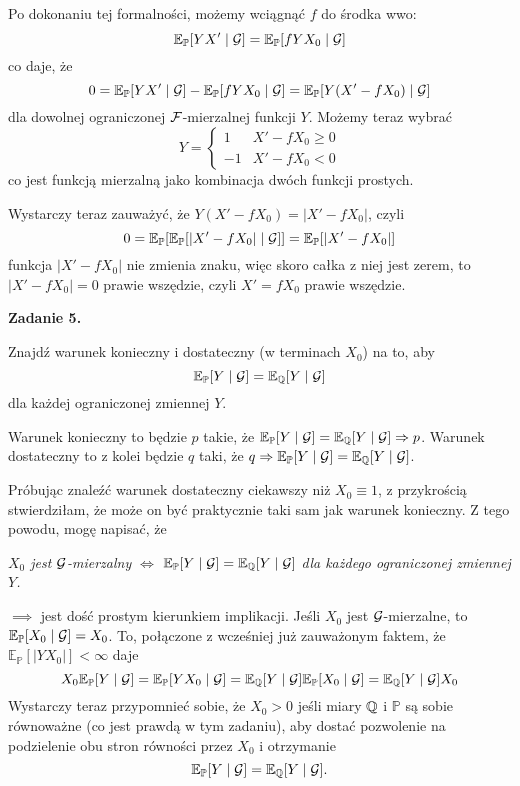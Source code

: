\documentclass{article}
\newcommand{\E}{\mathbb{E}}
\renewcommand{\P}{\mathbb{P}}
\begin{document}

Po dokonaniu tej formalności, możemy wciągnąć $f$ do środka wwo:
$$\E_{\P}[YX'\;|\;\set{G}]=\E_{\P}[fYX_0\;|\;\set{G}]$$
co daje, że
$$0=\E_{\P}[YX'\;|\;\set{G}]-\E_{\P}[fYX_0\;|\;\set{G}]=\E_{\P}[Y(X'-fX_0)\;|\;\set{G}]$$
dla dowolnej ograniczonej $\mathcal{F}$-mierzalnej funkcji $Y$. Możemy teraz wybrać
$$Y=\begin{cases}1&X'-fX_0\geq 0\\ -1&X'-fX_0<0\end{cases}$$
co jest funkcją mierzalną jako kombinacja dwóch funkcji prostych.

Wystarczy teraz zauważyć, że $Y(X'-fX_0)=|X'-fX_0|$, czyli
$$0=\E_{\P}[\E_{\P}[|X'-fX_0|\;|\;\set{G}]]=\E_{\P}[|X'-fX_0|]$$
funkcja $|X'-fX_0|$ nie zmienia znaku, więc skoro całka z niej jest zerem, to $|X'-fX_0|=0$ prawie wszędzie, czyli $X'=fX_0$ prawie wszędzie.

\bigskip

{\bfseries{\large\color{orange}Zadanie 5.}

  Znajdź warunek konieczny i dostateczny (w terminach $X_0$) na to, aby
  $$\E_{\P}[Y\;|\;\set{G}]=\E_{\Q}[Y\;|\;\set{G}]$$
  dla każdej ograniczonej zmiennej $Y$.
}

Warunek konieczny to będzie $p$ takie, że $\E_{\P}[Y\;|\;\set{G}]=\E_{\Q}[Y\;|\;\set{G}]\implies p$. Warunek dostateczny to z kolei będzie $q$ taki, że $q\implies \E_{\P}[Y\;|\;\set{G}]=\E_{\Q}[Y\;|\;\set{G}]$.

Próbując znaleźć warunek dostateczny ciekawszy niż $X_0\equiv 1$, z przykrością stwierdziłam, że może on być praktycznie taki sam jak warunek konieczny. Z tego powodu, mogę napisać, że

\begin{center}\slshape
  $X_0$ jest $\mathcal{G}$-mierzalny $\iff$ $\E_{\P}[Y\;|\;\set{G}]=\E_{\Q}[Y\;|\;\set{G}]$ dla każdego ograniczonej zmiennej $Y$.
\end{center}

$\implies$ jest dość prostym kierunkiem implikacji. Jeśli $X_0$ jest $\mathcal{G}$-mierzalne, to $\E_{\P}[X_0\;|\;\set{G}]=X_0$. To, połączone z wcześniej już zauważonym faktem, że $\E_{\P}[|YX_0|]<\infty$ daje
$$X_0\E_{\P}[Y\;|\;\set{G}]=\E_{\P}[YX_0\;|\;\set{G}]=\E_{\Q}[Y\;|\;\set{G}]\E_{\P}[X_0\;|\;\set{G}]=\E_{\Q}[Y\;|\;\set{G}]X_0$$
Wystarczy teraz przypomnieć sobie, że $X_0>0$ jeśli miary $\operatorname{\mathbb{Q}}$ i $\P$ są sobie równoważne (co jest prawdą w tym zadaniu), aby dostać pozwolenie na podzielenie obu stron równości przez $X_0$ i otrzymanie
$$\E_{\P}[Y\;|\;\set{G}]=\E_{\Q}[Y\;|\;\set{G}].$$
\end{document}
